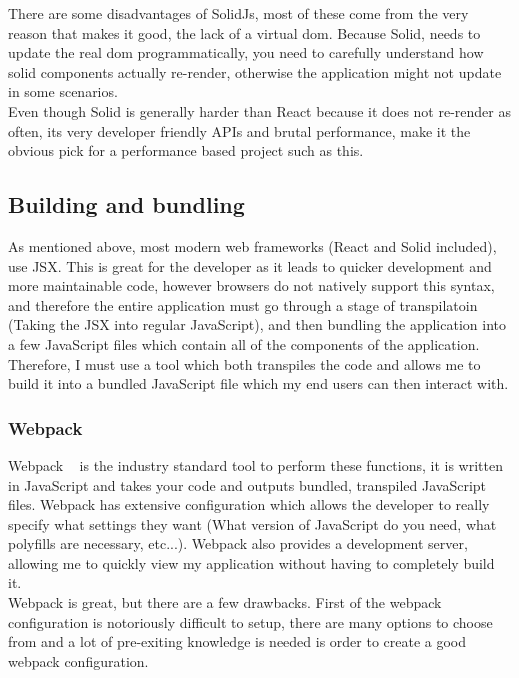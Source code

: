 \documentclass[titlepage]{article}
\begin{document}
There are some disadvantages of SolidJs, most of these come from the very reason that makes it good, the lack of a virtual dom. Because Solid, needs to update the real dom programmatically, you need to carefully understand how solid components actually re-render, otherwise the application might not update in some scenarios. \\

Even though Solid is generally harder than React because it does not re-render as often, its very developer friendly APIs and brutal performance, make it the obvious pick for a performance based project such as this.

\subsection{Building and bundling}
As mentioned above, most modern web frameworks (React and Solid included), use JSX. This is great for the developer as it leads to quicker development and more maintainable code, however browsers do not natively support this syntax, and therefore the entire application must go through a stage of transpilatoin (Taking the JSX into regular JavaScript), and then bundling the application into a few JavaScript files which contain all of the components of the application. Therefore, I must use a tool which both transpiles the code and allows me to build it into a bundled JavaScript file which my end users can then interact with.

\subsubsection{Webpack}
Webpack ~\cite{webpack} is the industry standard tool to perform these functions, it is written in JavaScript and takes your code and outputs bundled, transpiled JavaScript files. Webpack has extensive configuration which allows the developer to really specify what settings they want (What version of JavaScript do you need, what polyfills are necessary, etc...). Webpack also provides a development server, allowing me to quickly view my application without having to completely build it. \\

Webpack is great, but there are a few drawbacks. First of the webpack configuration is notoriously difficult to setup, there are many options to choose from and a lot of pre-exiting knowledge is needed is order to create a good webpack configuration. \\
\end{document}
